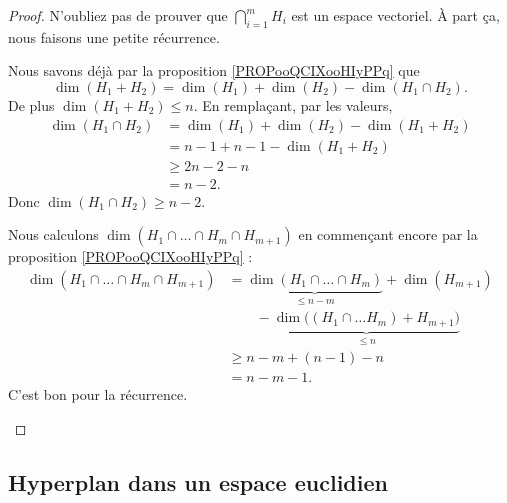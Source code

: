 \begin{proof}
	N'oubliez pas de prouver que \( \bigcap_{i=1}^mH_i\) est un espace vectoriel. À part ça, nous faisons une petite récurrence.
	\begin{subproof}
		\spitem[Pour \( m=2\)]
		Nous savons déjà par la proposition \ref{PROPooQCIXooHIyPPq} que
		\begin{equation}
			\dim(H_1 + H_2)=\dim(H_1)+\dim(H_2)-\dim(H_1\cap H_2).
		\end{equation}
		De plus \( \dim(H_1+H_2)\leq n\). En remplaçant, par les valeurs,
		\begin{subequations}
			\begin{align}
				\dim(H_1\cap H_2) & =\dim(H_1)+\dim(H_2)-\dim(H_1+ H_2) \\
				                  & =n-1+n-1-\dim(H_1+H_2)              \\
				                  & \geq 2n-2-n                         \\
				                  & =n-2.
			\end{align}
		\end{subequations}
		Donc \( \dim(H_1\cap H_2)\geq n-2\).

		\spitem[La récurrence]
		Nous calculons \( \dim(H_1\cap\ldots\cap H_m\cap H_{m+1})\) en commençant encore par la proposition \ref{PROPooQCIXooHIyPPq} :
		\begin{subequations}
			\begin{align}
				\dim(H_1\cap \ldots\cap H_m\cap H_{m+1}) & =\underbrace{\dim(H_1\cap\ldots\cap H_m)}_{\leq n-m}+\dim(H_{m+1})        \\
				                                         & \qquad -\underbrace{\dim\big( (H_1\cap\ldots H_m)+H_{m+1} \big)}_{\leq n} \\
				                                         & \geq n-m+(n-1)-n                                                          \\
				                                         & =n-m-1.
			\end{align}
		\end{subequations}
		C'est bon pour la récurrence.
	\end{subproof}
\end{proof}

\subsection{Hyperplan dans un espace euclidien}

